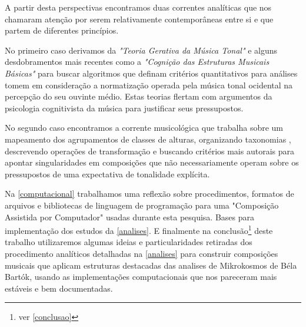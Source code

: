 \documentclass[
	12pt,				%
	openright,			%
	twoside,			%
	a4paper,			%
	english,			%
	french,				%
	spanish,			%
	brazil				%
	]{abntex2}
\begin{document}
A partir desta perspectivas encontramos duas correntes analíticas que nos chamaram atenção por serem relativamente contemporâneas entre si e que partem de diferentes princípios. 

No primeiro caso derivamos da \textit{"Teoria Gerativa da Música Tonal"}\cite{lerdahl1983generative} e alguns desdobramentos mais recentes como a \textit{"Cognição das Estruturas Musicais Básicas"}\cite{temperley2001cognition} para buscar algoritmos que definam critérios quantitativos para análises tomem em consideração a normatização operada pela música tonal ocidental na percepção do seu ouvinte médio. Estas teorias flertam com argumentos da psicologia cognitivista da música\cite{krumhansl1990cognitive} para justificar seus pressupostos.

No segundo caso encontramos a corrente musicológica que trabalha sobre um mapeamento dos agrupamentos de classes de alturas, organizando taxonomias \cite{forte1973structure}, descrevendo operações de transformação\cite{straus2004} e buscando critérios mais autorais para apontar singularidades em composições\cite{lester1989analytic,straus2004} que não necessariamente operam sobre os pressupostos de uma expectativa de tonalidade explícita.

Na \autoref{computacional} trabalhamos uma reflexão sobre procedimentos, formatos de arquivos e bibliotecas de linguagem de programação para uma "Composição Assistida por Computador" usadas durante esta pesquisa. Bases para implementação dos estudos da \autoref{analises}.
\linebreak
\linebreak
\linebreak
E finalmente na conclusão\footnote{ ver \autoref{conclusao}} deste trabalho utilizaremos algumas ideias e particularidades retiradas dos procedimento analíticos detalhadas na \autoref{analises} para construir composições musicais que aplicam estruturas destacadas das analises de Mikrokosmos de Béla Bartók, usando as implementações computacionais que nos pareceram mais estáveis e bem documentadas.
\end{document}

